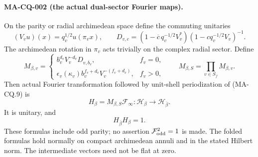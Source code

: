 \paragraph{MA-CQ-002 (the actual dual-sector Fourier maps).}
On the parity or radial archimedean space define the
commuting unitaries
\[
 (V_vu)(x)=q_v^{1/2}u(\pi_v x),\qquad
 D_{v,c}=(1-\overline c\,q_v^{-1/2}V_v^*)
                              (1-cq_v^{-1/2}V_v)^{-1}.
\tag{MA-CQ.10}
\]
The archimedean rotation in $\pi_v$ acts trivially on
the complex radial sector.  Define
\[
 M_{\beta,v}=
 \begin{cases}
   b_v^{d_v}V_v^{-d_v}D_{v,\overline b_v},& f_v=0,\\
   \epsilon_v(\kappa_v)b_v^{f_v+d_v}
                                V_v^{-(f_v+d_v)},& f_v>0,
 \end{cases}
 \qquad M_{\beta,S}=\prod_{v\in S_f}M_{\beta,v}.
\tag{MA-CQ.11}
\]
Then actual Fourier transformation followed by
unit-shell periodization of (MA-CQ.9) is
\[
          H_\beta=M_{\beta,S}\mathcal F_\infty:
                        \mathscr H_\beta\longrightarrow
                                      \mathscr H_{\overline\beta}.
\tag{MA-CQ.12}
\]
It is unitary, and
\[
                         H_{\overline\beta}H_\beta=1.
\tag{MA-CQ.13}
\]
These formulas include odd parity; no assertion
$\mathcal F_{\rm odd}^2=1$ is made.
The folded formulas hold normally on compact
archimedean annuli and in the stated Hilbert norm.
The intermediate vectors need not be flat at zero.


